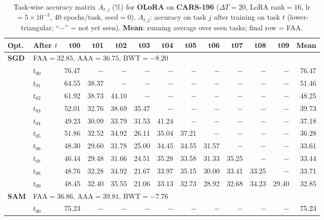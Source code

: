 \begin{table}[ht]
\centering
\caption{%
  Task-wise accuracy matrix $A_{t,j}$ (\%) for \textbf{OLoRA} on \textbf{CARS-196} ($\Delta T=20$, LoRA rank$=16$, lr$=5\times10^{-3}$, 40 epochs/task, seed$=0$).
  $A_{t,j}$: accuracy on task $j$ after training on task $t$  (lower-triangular; ``$-$'' = not yet seen).
  \textbf{Mean}: running average over seen tasks; final row = FAA.
}
\label{tab:raw_olora_cars196}
\setlength{\tabcolsep}{2.8pt}
\renewcommand{\arraystretch}{0.88}
\scriptsize
\begin{tabular}{@{}l l r r r r r r r r r r r@{}}
\toprule
\textbf{Opt.} & \textbf{After $t$} & \textbf{t00} & \textbf{t01} & \textbf{t02} & \textbf{t03} & \textbf{t04} & \textbf{t05} & \textbf{t06} & \textbf{t07} & \textbf{t08} & \textbf{t09} & \textbf{Mean} \\
\midrule
\multirow{11}{*}{\textbf{SGD}} & \multicolumn{12}{l}{\quad\small FAA$=32.85$,\; AAA$=36.75$,\; BWT$=-8.20$} \\
 & $t_{00}$ & 76.47 & $-$ & $-$ & $-$ & $-$ & $-$ & $-$ & $-$ & $-$ & $-$ & 76.47 \\
 & $t_{01}$ & 64.55 & 38.37 & $-$ & $-$ & $-$ & $-$ & $-$ & $-$ & $-$ & $-$ & 51.46 \\
 & $t_{02}$ & 61.92 & 38.73 & 44.10 & $-$ & $-$ & $-$ & $-$ & $-$ & $-$ & $-$ & 48.25 \\
 & $t_{03}$ & 52.01 & 32.76 & 38.69 & 35.47 & $-$ & $-$ & $-$ & $-$ & $-$ & $-$ & 39.73 \\
 & $t_{04}$ & 49.23 & 30.09 & 33.79 & 31.53 & 41.24 & $-$ & $-$ & $-$ & $-$ & $-$ & 37.18 \\
 & $t_{05}$ & 51.86 & 32.52 & 34.92 & 26.11 & 35.04 & 37.21 & $-$ & $-$ & $-$ & $-$ & 36.28 \\
 & $t_{06}$ & 48.30 & 29.60 & 31.78 & 25.00 & 34.45 & 34.55 & 31.57 & $-$ & $-$ & $-$ & 33.61 \\
 & $t_{07}$ & 46.44 & 29.48 & 31.66 & 24.51 & 35.28 & 33.58 & 31.33 & 35.25 & $-$ & $-$ & 33.44 \\
 & $t_{08}$ & 48.76 & 32.28 & 34.92 & 21.67 & 33.97 & 35.15 & 30.00 & 33.41 & 33.25 & $-$ & 33.71 \\
 & $t_{09}$ & 48.45 & 32.40 & 35.55 & 21.06 & 33.13 & 32.73 & 28.92 & 32.68 & 34.23 & 29.40 & 32.85 \\
\midrule
\multirow{11}{*}{\textbf{SAM}} & \multicolumn{12}{l}{\quad\small FAA$=36.86$,\; AAA$=39.81$,\; BWT$=-7.76$} \\
 & $t_{00}$ & 75.23 & $-$ & $-$ & $-$ & $-$ & $-$ & $-$ & $-$ & $-$ & $-$ & 75.23 \\

\end{tabular}
\end{table}
